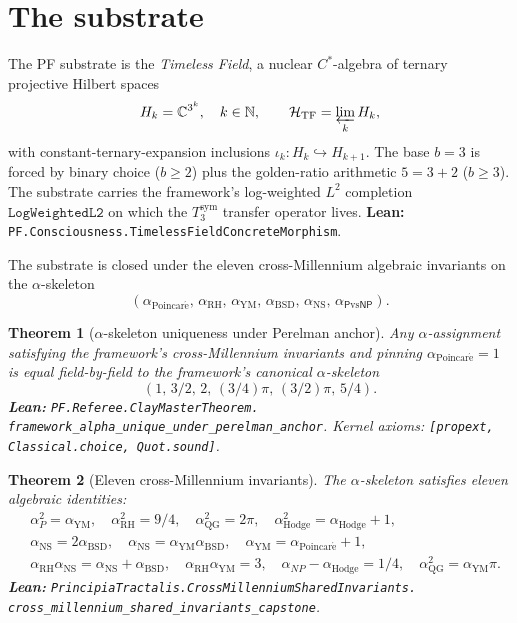 \documentclass[11pt,a4paper]{article}
\theoremstyle{plain}
\newtheorem{theorem}{Theorem}[section]
\theoremstyle{definition}
\begin{document}
\section{The substrate}
\label{sec:substrate}

The PF substrate is the \emph{Timeless Field}, a nuclear $C^{*}$-algebra
of ternary projective Hilbert spaces
\[
H_{k} = \mathbb{C}^{3^{k}}, \quad k \in \mathbb{N},
\qquad
\mathcal{H}_{\mathrm{TF}} = \varprojlim_{k} H_{k},
\]
with constant-ternary-expansion inclusions
$\iota_k: H_k \hookrightarrow H_{k+1}$. The base $b = 3$ is forced by
binary choice ($b \ge 2$) plus the golden-ratio arithmetic
$5 = 3 + 2$ ($b \ge 3$). The substrate carries the framework's
log-weighted $L^{2}$ completion $\mathtt{LogWeightedL2}$ on which the
$T_{3}^{\mathrm{sym}}$ transfer operator lives. \textbf{Lean:}
\texttt{PF.Consciousness.TimelessFieldConcreteMorphism}.

The substrate is closed under the eleven cross-Millennium algebraic
invariants on the $\alpha$-skeleton
\[
(\alpha_{\mathrm{Poincar\acute e}},\, \alpha_{\mathrm{RH}},\,
\alpha_{\mathrm{YM}},\, \alpha_{\mathrm{BSD}},\,
\alpha_{\mathrm{NS}},\, \alpha_{\mathsf{P}\mathrm{vs}\mathsf{NP}}).
\]

\begin{theorem}[$\alpha$-skeleton uniqueness under Perelman anchor]
\label{thm:alpha-unique}
Any $\alpha$-assignment satisfying the framework's cross-Millennium
invariants and pinning
$\alpha_{\mathrm{Poincar\acute e}} = 1$ is equal field-by-field to
the framework's canonical $\alpha$-skeleton
\[
(1,\, 3/2,\, 2,\, (3/4)\pi,\, (3/2)\pi,\, 5/4).
\]
\textbf{Lean:}
\texttt{PF.Referee.ClayMasterTheorem.\\
framework\_alpha\_unique\_under\_perelman\_anchor}.
Kernel axioms: \texttt{[propext, Classical.choice, Quot.sound]}.
\end{theorem}

\begin{theorem}[Eleven cross-Millennium invariants]
\label{thm:eleven-invariants}
The $\alpha$-skeleton satisfies eleven algebraic identities:
\begin{align*}
&\alpha_{P}^{2} = \alpha_{\mathrm{YM}}, \quad
\alpha_{\mathrm{RH}}^{2} = 9/4, \quad
\alpha_{\mathrm{QG}}^{2} = 2\pi, \quad
\alpha_{\mathrm{Hodge}}^{2} = \alpha_{\mathrm{Hodge}} + 1, \\
&\alpha_{\mathrm{NS}} = 2 \alpha_{\mathrm{BSD}}, \quad
\alpha_{\mathrm{NS}} = \alpha_{\mathrm{YM}} \alpha_{\mathrm{BSD}}, \quad
\alpha_{\mathrm{YM}} = \alpha_{\mathrm{Poincar\acute e}} + 1, \\
&\alpha_{\mathrm{RH}} \alpha_{\mathrm{NS}} =
  \alpha_{\mathrm{NS}} + \alpha_{\mathrm{BSD}}, \quad
\alpha_{\mathrm{RH}} \alpha_{\mathrm{YM}} = 3, \quad
\alpha_{NP} - \alpha_{\mathrm{Hodge}} = 1/4, \quad
\alpha_{\mathrm{QG}}^{2} = \alpha_{\mathrm{YM}} \pi.
\end{align*}
\textbf{Lean:}
\texttt{PrincipiaTractalis.CrossMillenniumSharedInvariants.\\
cross\_millennium\_shared\_invariants\_capstone}.
\end{theorem}
\end{document}
